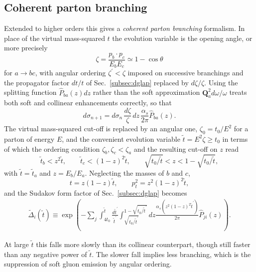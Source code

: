 \subsection{Coherent parton branching}
\label{sec:coherentPartonBranching}
Extended to higher orders this gives a \emph{coherent parton branching} formalism.
In place of the virtual mass-squared \(t\) the evolution variable is the opening
angle, or more precisely
\begin{equation}
	\zeta = \frac{p_b\cdot p_c}{E_bE_c} \simeq 1-\cos\theta
	\label{eq:zeta}
\end{equation}
for \(a\to bc\), with angular ordering \(\zeta^\prime<\zeta\) imposed on successive
branchings and the propagator factor \(dt/t\) of Sec.~\ref{subsec:dglap} replaced by
\(d\zeta/\zeta\). Using the splitting function \(\hat{P}_{ba}(z)dz\) rather than the
soft approximation \(\mathbf{Q}_a^2d\omega/\omega\) treats both soft and collinear
enhancements correctly, so that
\begin{equation}
	d\sigma_{n+1} = d\sigma_n\,\frac{d\zeta}{\zeta}\,dz\,
	\frac{\alpha_s}{2\pi}\hat{P}_{ba}(z).
	\label{eq:coherentBranching}
\end{equation}
The virtual mass-squared cut-off is replaced by an angular one,
\(\zeta_0 = t_0/E^2\) for a parton of energy \(E\), and the convenient evolution
variable \(\tilde{t} = E^2\zeta \geq t_0\) in terms of which the ordering condition \(\zeta_b,\zeta_c<\zeta_a\) and the
resulting cut-off on \(z\) read
\begin{equation}
	\tilde{t}_b < z^2\tilde{t},
	\qquad
	\tilde{t}_c < (1-z)^2\tilde{t},
	\qquad
	\sqrt{t_0/\tilde{t}} < z < 1-\sqrt{t_0/\tilde{t}} ,
	\label{eq:orderingCutoff}
\end{equation}
with \(\tilde{t}=\tilde{t}_a\) and \(z=E_b/E_a\). Neglecting the masses of \(b\) and
\(c\),
\begin{equation}
	t = z(1-z)\tilde{t},
	\qquad
	p_t^2 = z^2(1-z)^2\tilde{t},
	\label{eq:tAndPt}
\end{equation}
and the Sudakov form factor of Sec.~\ref{subsec:dglap} becomes
\begin{align}
	\tilde{\Delta}_i(\tilde{t}) \equiv \exp(-\sum_j\int_{4t_0}^{\tilde{t}}
	\frac{d\tilde{t}^\prime}{\tilde{t}^\prime}
	\int_{\sqrt{t_0/\tilde{t}^\prime}}^{1-\sqrt{t_0/\tilde{t}^\prime}} dz
	\frac{\alpha_s(z^2(1-z)^2\tilde{t}^\prime)}{2\pi} \hat{P}_{ji}(z)).
	\label{eq:coherentSudakov}
\end{align}

At large \(\tilde{t}\) this falls more slowly than its collinear counterpart, though
still faster than any negative power of \(\tilde{t}\). The slower fall implies less
branching, which is the suppression of soft gluon emission by angular ordering.

